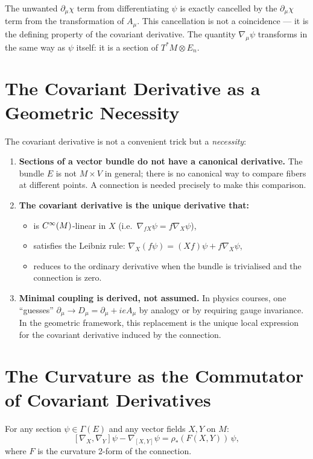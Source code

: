 The unwanted $\partial_\mu\chi$ term from differentiating $\psi$ is exactly cancelled by the $\partial_\mu\chi$ term from the transformation of $A_\mu$. This cancellation is not a coincidence --- it is the defining property of the covariant derivative. The quantity $\nabla_\mu\psi$ transforms in the same way as $\psi$ itself: it is a section of $T^*M \otimes E_n$.

\section{The Covariant Derivative as a Geometric Necessity}

The covariant derivative is not a convenient trick but a \emph{necessity}:

\begin{enumerate}
\item \textbf{Sections of a vector bundle do not have a canonical derivative.} The bundle $E$ is not $M \times V$ in general; there is no canonical way to compare fibers at different points. A connection is needed precisely to make this comparison.

\item \textbf{The covariant derivative is the unique derivative that:}
\begin{itemize}
\item is $C^{\infty}(M)$-linear in $X$ (i.e.\ $\nabla_{fX}\psi = f\nabla_X\psi$),
\item satisfies the Leibniz rule: $\nabla_X(f\psi) = (Xf)\psi + f\nabla_X\psi$,
\item reduces to the ordinary derivative when the bundle is trivialised and the connection is zero.
\end{itemize}

\item \textbf{Minimal coupling is derived, not assumed.} In physics courses, one ``guesses'' $\partial_\mu \to D_\mu = \partial_\mu + ieA_\mu$ by analogy or by requiring gauge invariance. In the geometric framework, this replacement is the unique local expression for the covariant derivative induced by the connection.
\end{enumerate}

\section{The Curvature as the Commutator of Covariant Derivatives}

\begin{theorem}
For any section $\psi \in \Gamma(E)$ and any vector fields $X, Y$ on $M$:
\begin{equation}
\boxed{[\nabla_X, \nabla_Y]\psi - \nabla_{[X,Y]}\psi = \rho_*(F(X, Y))\,\psi,}
\end{equation}
where $F$ is the curvature 2-form of the connection.
\end{theorem}

